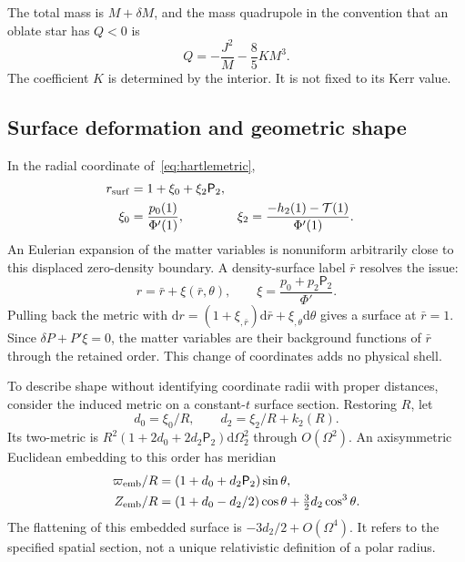 \documentclass[aps,prd,reprint,a4paper,nofootinbib,floatfix]{revtex4-2}
\newcommand{\dd}{\mathrm d}
\begin{document}
The total mass is $M+\delta M$, and the mass quadrupole in the convention that an oblate star has $Q<0$ is
\begin{equation}
 Q=-\frac{J^2}{M}-\frac85KM^3.
 \label{eq:quadrupole}
\end{equation}
The coefficient $K$ is determined by the interior. It is not fixed to its Kerr value.

\subsection{Surface deformation and geometric shape}
In the radial coordinate of~\eqref{eq:hartlemetric},
\begin{align}
 r_{\rm surf}&=1+\xi_0+\xi_2\mathsf P_2,\nonumber\\
 \xi_0&=\frac{p_0(1)}{\Phi'(1)},&
 \xi_2&=\frac{-h_2(1)-\mathcal T(1)}{\Phi'(1)}.
 \label{eq:surface}
\end{align}
An Eulerian expansion of the matter variables is nonuniform arbitrarily close to this displaced zero-density boundary. A density-surface label $\bar r$ resolves the issue:
\begin{equation}
 r=\bar r+\xi(\bar r,\theta),\qquad
 \xi=\frac{p_0+p_2\mathsf P_2}{\Phi'}.
 \label{eq:lagrange}
\end{equation}
Pulling back the metric with
$\dd r=(1+\xi_{,\bar r})\dd\bar r+\xi_{,\theta}\dd\theta$
gives a surface at $\bar r=1$. Since $\delta P+P'\xi=0$, the matter variables are their background functions of $\bar r$ through the retained order. This change of coordinates adds no physical shell.

To describe shape without identifying coordinate radii with proper distances, consider the induced metric on a constant-$t$ surface section. Restoring $R$, let
\begin{equation}
 d_0=\xi_0/R,\qquad d_2=\xi_2/R+k_2(R).
\end{equation}
Its two-metric is $R^2(1+2d_0+2d_2\mathsf P_2)\dd\Omega_2^2$ through $O(\Omega^2)$. An axisymmetric Euclidean embedding to this order has meridian
\begin{align}
 \varpi_{\rm emb}/R&=(1+d_0+d_2\mathsf P_2)\sin\theta,\nonumber\\
 Z_{\rm emb}/R&=(1+d_0-d_2/2)\cos\theta
                  +\tfrac32d_2\cos^3\theta.\label{eq:embedding}
\end{align}
The flattening of this embedded surface is $-3d_2/2+O(\Omega^4)$. It refers to the specified spatial section, not a unique relativistic definition of a polar radius.
\end{document}
